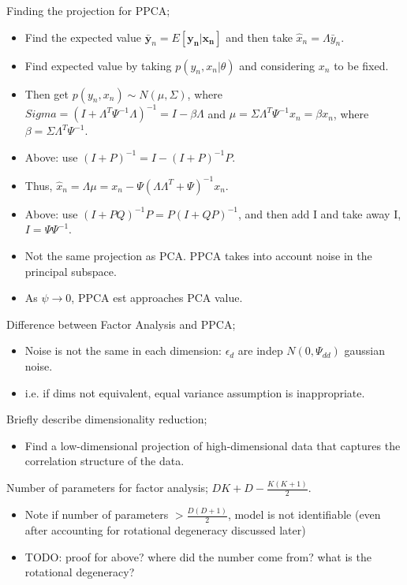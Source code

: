 \documentclass{article}
\begin{document}
Finding the projection for PPCA; \begin{itemize}
	\item Find the expected value $\mathbf{\bar{y}}_n=E[\mathbf{y_n|x_n}]$ and then take $\hat{x}_n=\Lambda\bar{y}_n$.
	\item Find expected value by taking $p(y_n, x_n|\theta)$ and considering $x_n$ to be fixed.
	\item Then get $p(y_n, x_n) \sim N(\mu, \Sigma)$, where $Sigma = (I+\Lambda^T\Psi^{-1}\Lambda)^{-1}=I-\beta\Lambda$ and $\mu=\Sigma\Lambda^T\Psi^{-1}x_n=\beta x_n$, where $\beta = \Sigma\Lambda^T\Psi^{-1}$.
	\item Above: use $(I+P)^{-1}=I-(I+P)^{-1}P$.
	\item Thus, $\hat{x}_n=\Lambda\mu=x_n - \Psi(\Lambda\Lambda^T+\Psi)^{-1}x_n$.
	\item Above: use $(I+PQ)^{-1}P=P(I+QP)^{-1}$, and then add I and take away I, $I=\Psi\Psi^{-1}$.
	\item Not the same projection as PCA. PPCA takes into account noise in the principal subspace.
	\item As $\psi\rightarrow 0$, PPCA est approaches PCA value.
\end{itemize}

Difference between Factor Analysis and PPCA; \begin{itemize}
	\item Noise is not the same in each dimension: $\epsilon_d$ are indep $N(0,\Psi_{dd})$ gaussian noise.
	\item i.e. if dims not equivalent, equal variance assumption is inappropriate.
\end{itemize}

Briefly describe dimensionality reduction; \begin{itemize}
	\item Find a low-dimensional projection of high-dimensional data that captures the correlation structure of the data.
\end{itemize}

Number of parameters for factor analysis; $DK + D - \frac{K(K+1)}{2}$. \begin{itemize}
	\item Note if number of parameters $> \frac{D(D+1)}{2}$, model is not identifiable (even after accounting for rotational degeneracy discussed later)
	\item TODO: proof for above? where did the number come from? what is the rotational degeneracy?
\end{itemize}
\end{document}
